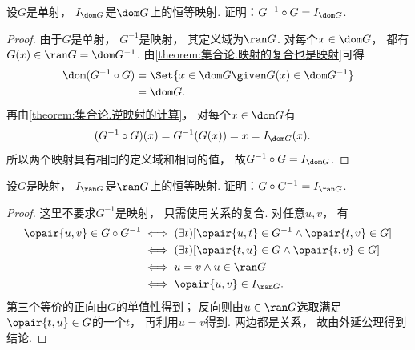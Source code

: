 \begin{example}\label{example:映射.逆映射与映射的复合}
    设\(G\)是单射，
    \(I_{\dom G}\)是\(\dom G\)上的恒等映射.
    证明：\(G^{-1} \circ G = I_{\dom G}\).
    \begin{proof}
        由于\(G\)是单射，
        \(G^{-1}\)是映射，
        其定义域为\(\ran G\).
        对每个\(x\in\dom G\)，
        都有\(G(x)\in\ran G=\dom G^{-1}\).
        由\cref{theorem:集合论.映射的复合也是映射}可得
        \begin{align*}
            \dom(G^{-1}\circ G)
            &=\Set{x\in\dom G\given G(x)\in\dom G^{-1}} \\
            &=\dom G.
        \end{align*}
        再由\cref{theorem:集合论.逆映射的计算}，
        对每个\(x\in\dom G\)有
        \begin{align*}
            (G^{-1}\circ G)(x) &=G^{-1}(G(x))=x=I_{\dom G}(x).
        \end{align*}
        所以两个映射具有相同的定义域和相同的值，
        故\(G^{-1}\circ G=I_{\dom G}\).
    \end{proof}
\end{example}
\begin{example}\label{example:映射.映射与逆映射的复合}
    设\(G\)是映射，
    \(I_{\ran G}\)是\(\ran G\)上的恒等映射.
    证明：\(G \circ G^{-1} = I_{\ran G}\).
    \begin{proof}
        这里不要求\(G^{-1}\)是映射，
        只需使用关系的复合.
        对任意\(u,v\)，
        有
        \begin{align*}
            \opair{u,v}\in G\circ G^{-1}
            &\iff(\exists t)[\opair{u,t}\in G^{-1}\land\opair{t,v}\in G] \\
            &\iff(\exists t)[\opair{t,u}\in G\land\opair{t,v}\in G] \\
            &\iff u=v\land u\in\ran G \\
            &\iff\opair{u,v}\in I_{\ran G}.
        \end{align*}
        第三个等价的正向由\(G\)的单值性得到；
        反向则由\(u\in\ran G\)选取满足\(\opair{t,u}\in G\)的一个\(t\)，
        再利用\(u=v\)得到.
        两边都是关系，
        故由外延公理得到结论.
    \end{proof}
\end{example}
